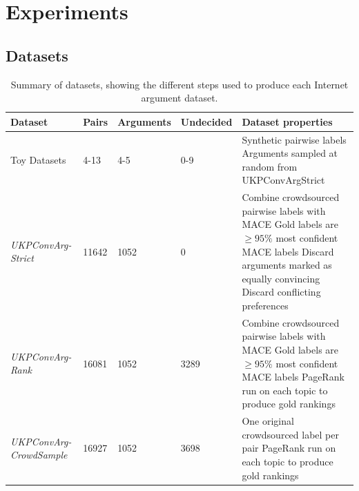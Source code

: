 \section{Experiments}\label{sec:expts}

\subsection{Datasets}
\begin{table}
\small
  \begin{tabularx}{\textwidth}{ p{2.2cm} | p{1cm} p{1.5cm} p{1.6cm} X }
  Dataset & Pairs & Arguments & Undecided & Dataset properties \\\hline\hline
  Toy Datasets & 4-13 & 4-5 & 0-9 & Synthetic pairwise labels
  \newline Arguments sampled at random from UKPConvArgStrict\\  
  \hline\emph{UKPConvArg-Strict} &
  11642 &
  1052 & 
  0 &
  Combine crowdsourced pairwise labels with MACE \newline
  Gold labels are $\ge 95\%$ most confident MACE labels \newline
  Discard arguments marked as equally convincing \newline
  Discard conflicting preferences \\
  \hline\emph{UKPConvArg-Rank} &
  16081 &
  1052 &
  3289 &
  Combine crowdsourced pairwise labels with MACE \newline
  Gold labels are $\ge 95\%$ most confident MACE labels \newline
  PageRank run on each topic to produce gold rankings \\  
  \hline\emph{UKPConvArg-CrowdSample} &
  16927 & 
  1052 &
  3698 &
  One original crowdsourced label per pair\newline
  PageRank run on each topic to produce gold rankings
  \end{tabularx}
  \caption{\label{tab:expt_data} Summary of datasets, showing the different steps used to produce each Internet argument dataset.}
\end{table}
